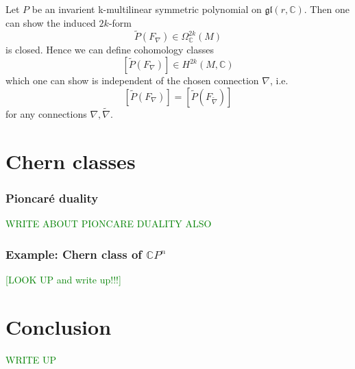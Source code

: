 \documentclass[a4paper]{article}
\theoremstyle{definition} \newtheorem*{definition}{Definition}
\theoremstyle{definition} \newtheorem*{definitions}{Definitions}
\theoremstyle{plain} \newtheorem{theorem}{Theorem}[section]
\theoremstyle{plain} \newtheorem{proposition}[theorem]{Proposition}
\theoremstyle{plain} \newtheorem{corollary}[theorem]{Corollary}
\theoremstyle{plain} \newtheorem{lemma}[theorem]{Lemma}
\theoremstyle{plain} \newtheorem{example}[theorem]{Example}
\newcommand{\finish}[1]{\textcolor{green}{#1}}
\newcommand{\complexnos}{\mathbb{C}}
\begin{document}
Let $P$ be an invarient k-multilinear symmetric polynomial on $\mathfrak{gl}(r, \complexnos)$. Then one can show the induced $2k$-form 
$$\tilde{P}(F_\nabla)\in \Omega^{2k}_\complexnos(M)$$
is closed. Hence we can define cohomology classes
$$[\tilde{P}(F_\nabla)]\in H^{2k}(M, \complexnos)$$
which one can show is independent of the chosen connection $\nabla$, i.e.
$$[\tilde{P}(F_\nabla)]=[\tilde{P}(F_{\tilde{\nabla}} )]$$
for any connections $\nabla, \tilde{\nabla}$. 

\section{Chern classes}
\subsubsection{Pioncar{\' e} duality}

\finish{WRITE ABOUT PIONCARE DUALITY ALSO}


\subsubsection{Example: Chern class of $\complexnos P^n$}
\finish{[LOOK UP and write up!!!]}

\section{Conclusion}
\finish{WRITE UP}
\end{document}

